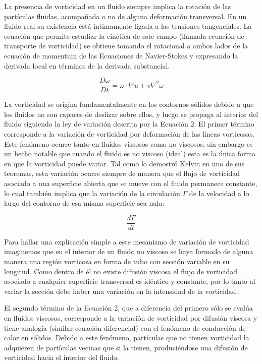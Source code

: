 \documentclass[12pt,twoside,onecolumn,openany]{article}
\begin{document}
La presencia de vorticidad en un fluido siempre implica la rotación de las partículas fluidas, acompañada o no de alguna deformación transversal. En un fluido real su existencia está íntimamente ligada a las tensiones tangenciales. La ecuación que permite estudiar la cinética de este campo (llamada ecuación de transporte de vorticidad) se obtiene tomando el rotacional a ambos lados de la ecuación de momentum de las Ecuaciones de Navier-Stokes y expresando la derivada local en términos de la derivada substancial.

\begin{equation}
    \frac{D \omega}{D t} = \omega \cdot \nabla u + v \nabla^{2} \omega
\end{equation}

La vorticidad se origina fundamentalmente en los contornos sólidos debido a que los fluidos no son capaces de deslizar sobre ellos, y luego se propaga al interior del fluido siguiendo la ley de variación descrita por la Ecuación 2. El primer término corresponde a la variación de vorticidad por deformación de las líneas vorticosas. Este fenómeno ocurre tanto en fluidos viscosos como no viscosos, sin embargo es un hecho notable que cuando el fluido es no viscoso (ideal) esta es la única forma en que la vorticidad puede variar. Tal como lo demostró Kelvin en uno de sus teoremas, esta variación ocurre siempre de manera que el flujo de vorticidad asociado a una superficie abierta que se mueve con el fluido permanece constante, lo cual también implica que la variación de la circulación $\Gamma$ de la velocidad a lo largo del contorno de esa misma superficie sea nula:

\begin{equation}
    \frac{d \Gamma}{d t}
\end{equation}

Para hallar una explicación simple a este mecanismo de variación de vorticidad imaginemos que en el interior de un fluido no viscoso se haya formado de alguna manera una región vorticosa en forma de tubo con sección variable en su longitud. Como dentro de él no existe difusión viscosa el flujo de vorticidad asociado a cualquier superficie transversal es idéntico y constante, por lo tanto al variar la sección debe haber una variación en la intensidad de la vorticidad.

El segundo término de la Ecuación 2, que a diferencia del primero sólo se evalúa en fluidos viscosos, corresponde a la variación de vorticidad por difusión viscosa y tiene analogía (similar ecuación diferencial) con el fenómeno de conducción de calor en sólidos. Debido a este fenómeno, partículas que no tienen vorticidad la adquieren de partículas vecinas que si la tienen, produciéndose una difusión de vorticidad hacia el interior del fluido.
\end{document}
